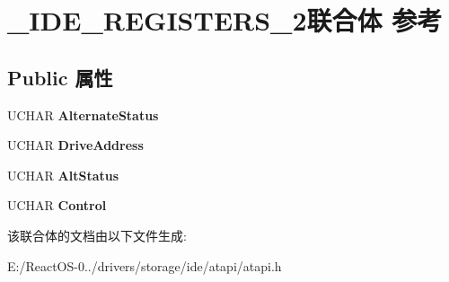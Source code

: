 \hypertarget{struct___i_d_e___r_e_g_i_s_t_e_r_s__2}{}\section{\+\_\+\+I\+D\+E\+\_\+\+R\+E\+G\+I\+S\+T\+E\+R\+S\+\_\+2联合体 参考}
\label{struct___i_d_e___r_e_g_i_s_t_e_r_s__2}
\subsection*{Public 属性}
\begin{DoxyCompactItemize}
\item 
\mbox{\label{struct___i_d_e___r_e_g_i_s_t_e_r_s__2_a9cc09fb6e887135eda68a588f5f66541}} 
U\+C\+H\+AR {\bfseries Alternate\+Status}
\item 
\mbox{\label{struct___i_d_e___r_e_g_i_s_t_e_r_s__2_a22985c9f4af1457032d23dc0335f9294}} 
U\+C\+H\+AR {\bfseries Drive\+Address}
\item 
\mbox{\label{struct___i_d_e___r_e_g_i_s_t_e_r_s__2_aa24cd50a8c740884acb3b45747c0695f}} 
U\+C\+H\+AR {\bfseries Alt\+Status}
\item 
\mbox{\label{struct___i_d_e___r_e_g_i_s_t_e_r_s__2_a741562ee750f27e0795d7bb089853fad}} 
U\+C\+H\+AR {\bfseries Control}
\end{DoxyCompactItemize}


该联合体的文档由以下文件生成\+:\begin{DoxyCompactItemize}
\item 
E\+:/\+React\+O\+S-\/0../drivers/storage/ide/atapi/atapi.\+h\end{DoxyCompactItemize}
